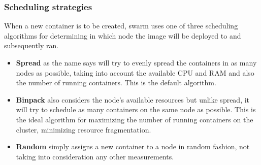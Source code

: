 \documentclass{article}
\begin{document}
\subsubsection{Scheduling strategies}
When a new container is to be created, swarm uses one of three scheduling algorithms for determining in which node the image will be deployed to and subsequently ran.
\begin{itemize}
\item \textbf{Spread} as the name says will try to evenly spread the containers in as many nodes as possible, taking into account the available CPU and RAM and also the number of running containers. This is the default algorithm.
\item \textbf{Binpack} also considers the node's available resources but unlike spread, it will try to schedule as many containers on the same node as possible. This is the ideal algorithm for maximizing the number of running containers on the cluster, minimizing resource fragmentation.
\item \textbf{Random} simply assigns a new container to a node in random fashion, not taking into consideration any other measurements.
\end{itemize}
\end{document}
